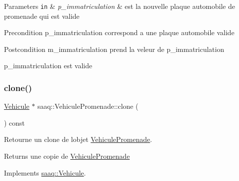 \begin{DoxyParams}[1]{Parameters}
\mbox{\tt in}  & {\em p\+\_\+immatriculation} & est la nouvelle plaque automobile de promenade qui est valide \\
\hline
\end{DoxyParams}
\begin{DoxyPrecond}{Precondition}
p\+\_\+immatriculation correspond a une plaque automobile valide 
\end{DoxyPrecond}
\begin{DoxyPostcond}{Postcondition}
m\+\_\+immatriculation prend la veleur de p\+\_\+immatriculation 

p\+\_\+immatriculation est valide 
\end{DoxyPostcond}
\mbox{\label{classsaaq_1_1VehiculePromenade_ac4dc7715d78c2c0aca03c0eb5818bf4a}} 
\subsubsection{\texorpdfstring{clone()}{clone()}}
{\footnotesize\ttfamily \hyperlink{classsaaq_1_1Vehicule}{Vehicule} $\ast$ saaq\+::\+Vehicule\+Promenade\+::clone (\begin{DoxyParamCaption}{ }\end{DoxyParamCaption}) const\hspace{0.3cm}{\ttfamily [virtual]}}



Retourne un clone de l\textquotesingle{}objet \hyperlink{classsaaq_1_1VehiculePromenade}{Vehicule\+Promenade}. 

\begin{DoxyReturn}{Returns}
une copie de \hyperlink{classsaaq_1_1VehiculePromenade}{Vehicule\+Promenade} 
\end{DoxyReturn}


Implements \hyperlink{classsaaq_1_1Vehicule}{saaq\+::\+Vehicule}.

\mbox{\label{classsaaq_1_1VehiculePromenade_a71338b24fa5d12cc432b7f7d29917b75}} 
